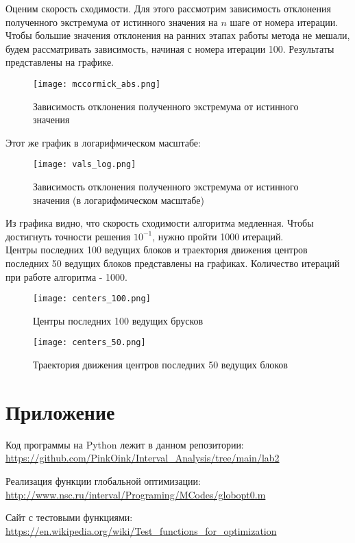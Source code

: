 Оценим скорость сходимости. Для этого рассмотрим зависимость отклонения полученного экстремума от истинного значения на $n$ шаге от номера итерации. Чтобы большие значения отклонения на ранних этапах работы метода не мешали, будем рассматривать зависимость, начиная с номера итерации 100. Результаты представлены на графике.

\newpage

\begin{figure}[h]
	\centering
	\texttt{[image: mccormick\_abs.png]}
	\caption{Зависимость отклонения полученного экстремума от истинного значения}
\end{figure}

Этот же график в логарифмическом масштабе:

\newpage

\begin{figure}[h]
	\centering
	\texttt{[image: vals\_log.png]}
	\caption{Зависимость отклонения полученного экстремума от истинного значения (в логарифмическом масштабе)}
\end{figure}

Из графика видно, что скорость сходимости алгоритма медленная. Чтобы достигнуть точности решения $10^{-1}$, нужно пройти 1000 итераций. \\

Центры последних 100 ведущих блоков и траектория движения центров последних 50 ведущих блоков представлены на графиках. Количество итераций при работе алгоритма - 1000.

\newpage

\begin{figure}[h]
	\centering
	\texttt{[image: centers\_100.png]}
	\caption{Центры последних 100 ведущих брусков}
\end{figure}

\newpage

\begin{figure}[h]
	\centering
	\texttt{[image: centers\_50.png]}
	\caption{Траектория движения центров последних 50 ведущих блоков}
\end{figure}



\section{Приложение}
Код программы на Python лежит в данном репозитории: \\
\url{https://github.com/PinkOink/Interval_Analysis/tree/main/lab2}{}

Реализация функции глобальной оптимизации: \\
\url{http://www.nsc.ru/interval/Programing/MCodes/globopt0.m}{}

Сайт с тестовыми функциями: \\
\url{https://en.wikipedia.org/wiki/Test_functions_for_optimization}{}


